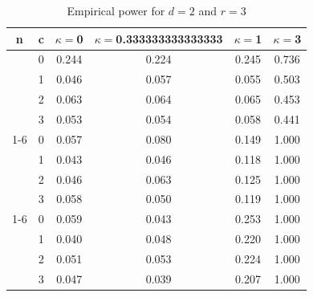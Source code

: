 \documentclass[oneside,11pt]{article}
\begin{document}
\begin{table}[H]
\centering
\caption{Empirical power for $d = 2$ and $r = 3$}
\centering
\begin{tabular}[t]{cccccc}
\toprule
n & c & $\kappa = $0 & $\kappa = $0.333333333333333 & $\kappa = $1 & $\kappa = $3\\
\midrule
 & 0 & 0.244 & 0.224 & 0.245 & 0.736\\

 & 1 & 0.046 & 0.057 & 0.055 & 0.503\\

 & 2 & 0.063 & 0.064 & 0.065 & 0.453\\

\multirow{-4}{*}{\centering\arraybackslash 10} & 3 & 0.053 & 0.054 & 0.058 & 0.441\\
\cmidrule{1-6}
 & 0 & 0.057 & 0.080 & 0.149 & 1.000\\

 & 1 & 0.043 & 0.046 & 0.118 & 1.000\\

 & 2 & 0.046 & 0.063 & 0.125 & 1.000\\

\multirow{-4}{*}{\centering\arraybackslash 50} & 3 & 0.058 & 0.050 & 0.119 & 1.000\\
\cmidrule{1-6}
 & 0 & 0.059 & 0.043 & 0.253 & 1.000\\

 & 1 & 0.040 & 0.048 & 0.220 & 1.000\\

 & 2 & 0.051 & 0.053 & 0.224 & 1.000\\

\multirow{-4}{*}{\centering\arraybackslash 100} & 3 & 0.047 & 0.039 & 0.207 & 1.000\\
\bottomrule
\end{tabular}
\end{table}
\end{document}
